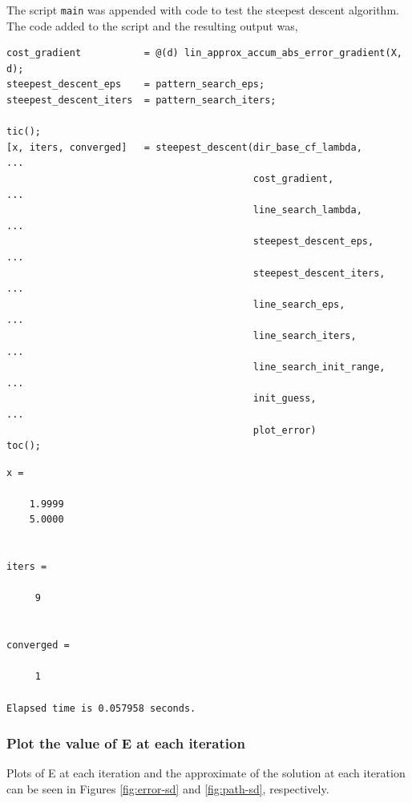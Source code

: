 \documentclass{article}
\begin{document}
The script \texttt{main} was appended with code to test the steepest descent algorithm.
The code added to the script and the resulting output was,

\vspace{0.25in}

\begin{lstlisting}
cost_gradient           = @(d) lin_approx_accum_abs_error_gradient(X, d);
steepest_descent_eps    = pattern_search_eps;
steepest_descent_iters  = pattern_search_iters;

tic();
[x, iters, converged]   = steepest_descent(dir_base_cf_lambda,      ...
                                           cost_gradient,           ...
                                           line_search_lambda,      ...
                                           steepest_descent_eps,    ...                                         
                                           steepest_descent_iters,  ...
                                           line_search_eps,         ...
                                           line_search_iters,       ...
                                           line_search_init_range,  ...
                                           init_guess,              ...
                                           plot_error)
toc();

\end{lstlisting}

\vspace{0.25in}

\begin{verbatim}
x =

    1.9999
    5.0000


iters =

     9


converged =

     1

Elapsed time is 0.057958 seconds.

\end{verbatim}

\vspace{0.25in}

\subsubsection{Plot the value of E at each iteration}

Plots of E at each iteration and the approximate of the solution at each iteration can be seen in Figures \ref{fig:error-sd} and \ref{fig:path-sd}, respectively.
\end{document}
